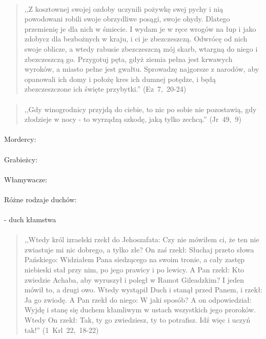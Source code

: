 \documentclass[10pt,a4paper,oneside]{article}
\begin{document}
\paragraph{}
\begin{quote}
,,Z kosztownej swojej ozdoby uczynili pożywkę swej pychy i nią powodowani robili swoje obrzydliwe posągi, swoje ohydy. Dlatego przemienię je dla nich w śmiecie. I wydam je w ręce wrogów na łup i jako zdobycz dla bezbożnych w kraju, i ci je zbezczeszczą. Odwrócę od nich swoje oblicze, a wtedy rabusie zbezczeszczą mój skarb, wtargną do niego i zbezczeszczą go. Przygotuj pęta, gdyż ziemia pełna jest krwawych wyroków, a miasto pełne jest gwałtu. Sprowadzę najgorsze z narodów, aby opanowali ich domy i położę kres ich dumnej potędze, i będą zbezczeszczone ich święte przybytki.'' \mbox{(Ez 7, 20-24)}
\end{quote}
\paragraph{}
\begin{quote}
,,Gdy winogrodnicy przyjdą do ciebie, to nic po sobie nie pozostawią, gdy złodzieje w nocy - to wyrządzą szkodę, jaką tylko zechcą.'' \mbox{(Jr 49, 9)}
\end{quote}
\paragraph{}
Mordercy:
\paragraph{}
Grabieżcy:
\paragraph{}
Włamywacze:
\paragraph{}
Różne rodzaje duchów:
\paragraph{}
- duch kłamstwa
\paragraph{}
\begin{quote}
,,Wtedy król izraelski rzekł do Jehoszafata: Czy nie mówiłem ci, że ten nie zwiastuje mi nic dobrego, a tylko złe? On zaś rzekł: Słuchaj przeto słowa Pańskiego: Widziałem Pana siedzącego na swoim tronie, a cały zastęp niebieski stał przy nim, po jego prawicy i po lewicy. A Pan rzekł: Kto zwiedzie Achaba, aby wyruszył i poległ w Ramot Gileadzkim? I jeden mówił to, a drugi owo. Wtedy wystąpił Duch i stanął przed Panem, i rzekł: Ja go zwiodę. A Pan rzekł do niego: W jaki sposób? A on odpowiedział: Wyjdę i stanę się duchem kłamliwym w ustach wszystkich jego proroków. Wtedy On rzekł: Tak, ty go zwiedziesz, ty to potrafisz. Idź więc i uczyń tak!'' \mbox{(1 Krl 22, 18-22)}
\end{quote}
\end{document}

